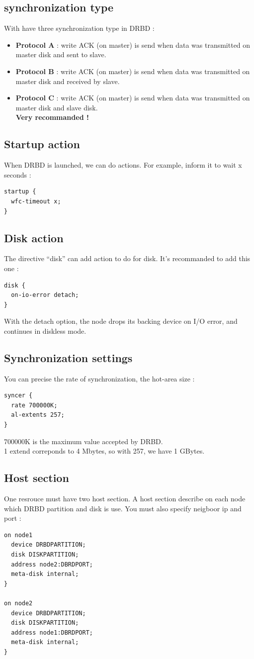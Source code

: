 \documentclass[a4paper,10pt]{report}
\begin{document}
\subsection{synchronization type}
With have three synchronization type in DRBD :
\begin{itemize}
\item \textbf{Protocol A} : write ACK (on master) is send when data was transmitted on master disk and sent to slave.
\item \textbf{Protocol B} : write ACK (on master) is send when data was transmitted on master disk and received by slave.
\item \textbf{Protocol C} : write ACK (on master) is send when data was transmitted on master disk and slave disk.\\
\textbf{Very recommanded !}
\end{itemize}

\subsection{Startup action}
When DRBD is launched, we can do actions. For example, inform it to wait x seconds :
\begin{lstlisting}
startup {
  wfc-timeout x;
}
\end{lstlisting}

\subsection{Disk action}
The directive ``disk'' can add action to do for disk. It's recommanded to add this one :
\begin{lstlisting}
disk {
  on-io-error detach;
}
\end{lstlisting}
With the detach option, the node drops its backing device on I/O error, and continues in diskless mode.

\subsection{Synchronization settings}
You can precise the rate of synchronization, the hot-area size :
\begin{lstlisting}
syncer {
  rate 700000K;
  al-extents 257;
}
\end{lstlisting}
700000K is the maximum value accepted by DRBD.\\
1 extend correponds to 4 Mbytes, so with 257, we have 1 GBytes.

\subsection{Host section}
\label{hostsection} 
One resrouce must have two host section. A host section describe on each node which DRBD partition and disk is use. You must also specify neigboor ip and port :
\begin{lstlisting}
on node1 
  device DRBDPARTITION;
  disk DISKPARTITION;
  address node2:DBRDPORT;
  meta-disk internal;
}

on node2 
  device DRBDPARTITION;
  disk DISKPARTITION;
  address node1:DBRDPORT;
  meta-disk internal;
}
\end{lstlisting}
\end{document}
